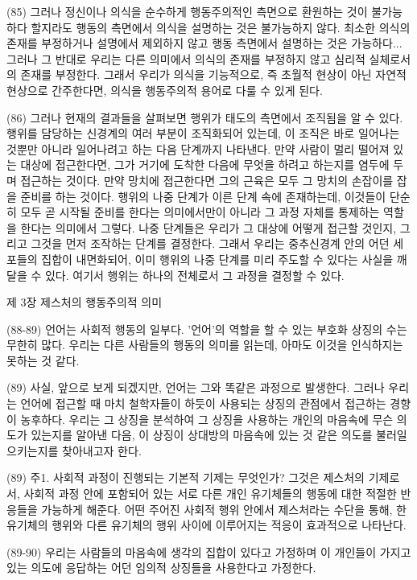 \documentclass[12pt, a4paper]{article}
\begin{document}
(85) 그러나 정신이나 의식을 순수하게 행동주의적인 측면으로 환원하는 것이 불가능하다 할지라도 행동의 측면에서 의식을 설명하는 것은 불가능하지 않다. 최소한 의식의 존재를 부정하거나 설명에서 제외하지 않고 행동 측면에서 설명하는 것은 가능하다... 그러나 그 반대로 우리는 다른 의미에서 의식의 존재를 부정하지 않고 심리적 실체로서의 존재를 부정한다. 그래서 우리가 의식을 기능적으로, 즉 초월적 현상이 아닌 자연적 현상으로 간주한다면, 의식을 행동주의적 용어로 다룰 수 있게 된다. 

(86) 그러나 현재의 결과들을 살펴보면 행위가 태도의 측면에서 조직됨을 알 수 있다. 행위를 담당하는 신경계의 여러 부분이 조직화되어 있는데, 이 조직은 바로 일어나는 것뿐만 아니라 일어나려고 하는 다음 단계까지 나타낸다. 만약 사람이 멀리 떨어져 있는 대상에 접근한다면, 그가 거기에 도착한 다음에 무엇을 하려고 하는지를 염두에 두며 접근하는 것이다. 만약 망치에 접근한다면 그의 근육은 모두 그 망치의 손잡이를 잡을 준비를 하는 것이다. 행위의 나중 단계가 이른 단계 속에 존재하는데, 이것들이 단순히 모두 곧 시작될 준비를 한다는 의미에서만이 아니라 그 과정 자체를 통제하는 역할을 한다는 의미에서 그렇다. 나중 단계들은 우리가 그 대상에 어떻게 접근할 것인지, 그리고 그것을 먼저 조작하는 단계를 결정한다. 그래서 우리는 중추신경계 안의 어던 세포들의 집합이 내면화되어, 이미 행위의 나중 단계를 미리 주도할 수 있다는 사실을 깨달을 수 있다. 여기서 행위는 하나의 전체로서 그 과정을 결정할 수 있다. 

제 3장 제스처의 행동주의적 의미

(88-89) 언어는 사회적 행동의 일부다. '언어'의 역할을 할 수 있는 부호화 상징의 수는 무한히 많다. 우리는 다른 사람들의 행동의 의미를 읽는데, 아마도 이것을 인식하지는 못하는 것 같다. 

(89) 사실, 앞으로 보게 되겠지만, 언어는 그와 똑같은 과정으로 발생한다. 그러나 우리는 언어에 접근할 때 마치 철학자들이 하듯이 사용되는 상징의 관점에서 접근하는 경향이 농후하다. 우리는 그 상징을 분석하여 그 상징을 사용하는 개인의 마음속에 무슨 의도가 있는지를 알아낸 다음, 이 상징이 상대방의 마음속에 있는 것 같은 의도를 불러일으키는지를 찾아내고자 한다.

(89) 주1. 사회적 과정이 진행되는 기본적 기제는 무엇인가? 그것은 제스처의 기제로서, 사회적 과정 안에 포함되어 있는 서로 다른 개인 유기체들의 행동에 대한 적절한 반응들을 가능하게 해준다. 어떤 주어진 사회적 행위 안에서 제스처라는 수단을 통해, 한 유기체의 행위와 다른 유기체의 행위 사이에 이루어지는 적응이 효과적으로 나타난다.  

(89-90) 우리는 사람들의 마음속에 생각의 집합이 있다고 가정하며 이 개인들이 가지고 있는 의도에 응답하는 어던 임의적 상징들을 사용한다고 가정한다. 
\end{document}

